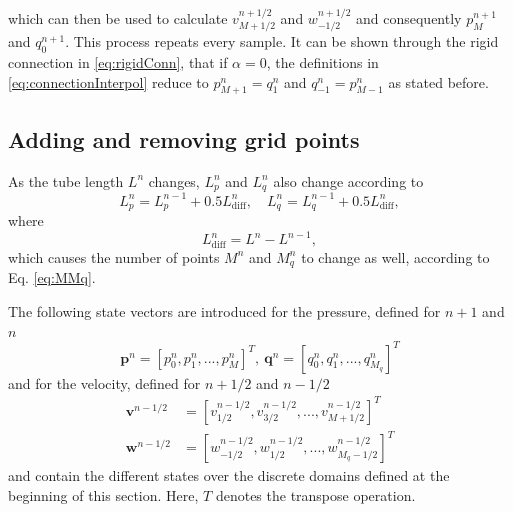 which can then be used to calculate $v_{M+1/2}^{n+1/2}$ and $w_{-1/2}^{n+1/2}$ and consequently $p_M^{n+1}$ and $q_0^{n+1}$. This process repeats every sample. It can be shown through the rigid connection in \eqref{eq:rigidConn}, that if $\alpha=0$, the definitions in \eqref{eq:connectionInterpol} reduce to $p_{M+1}^n = q_1^n$ and $q_{-1}^n = p_{M-1}^n$ as stated before.

\subsection{Adding and removing grid points}\label{sec:addRemove}
As the tube length $L^n$ changes, $L_p^n$ and $L_q^n$ also change according to
\begin{equation}
    L_p^n = L_p^{n-1} + 0.5 L_\text{diff}^n, \quad L_q^n =  L_q^{n-1} + 0.5L_\text{diff}^n,\label{eq:updateLs} 
\end{equation}
where
\begin{equation}
    L_\text{diff}^n = L^n-L^{n-1},\label{eq:lDiff}
\end{equation}
which causes the number of points $M^n$ and $M_q^n$ to change as well, according to Eq. \eqref{eq:MMq}.

The following state vectors are introduced for the pressure, defined for $n+1$ and $n$ %
\begin{equation}
    \mathbf{p}^n = [p_0^n, p_1^n, ..., p_M^n]^T,\ \mathbf{q}^n = [q_0^n, q_1^n, ..., q_{M_q}^n]^T
\end{equation}
and for the velocity, defined for $n+1/2$ and $n-1/2$
\begin{equation}
    \begin{aligned}
        \mathbf{v}^{n-1/2} &=  [v_{1/2}^{n-1/2}, v_{3/2}^{n-1/2}, ..., v_{M+1/2}^{n-1/2}]^T\\
        \mathbf{w}^{n-1/2} &=  [w_{-1/2}^{n-1/2}, w_{1/2}^{n-1/2}, ..., w_{M_q-1/2}^{n-1/2}]^T
    \end{aligned}
\end{equation}
and contain the different states over the discrete domains defined at the beginning of this section. Here, $T$ denotes the transpose operation.

